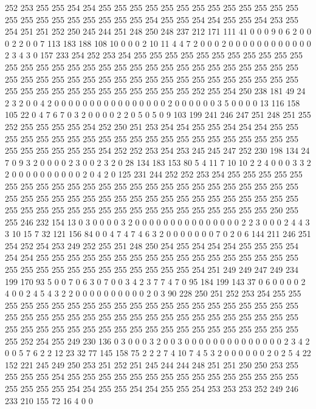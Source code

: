 252 253 255 255 254 254 255 255 255 255 255 255 255 255 255 255 255 255 255 255
255 255 255 255 255 255 255 255 254 255 255 254 254 255 255 254 253 255 254 251
251 252 250 245 244 251 248 250 248 237 212 171 111 41 0 0 0 9 0 6
2 0 0 0 2 2 0 0 7 113 183 188 108 10 0 0 0 2 10 11
4 4 7 2 0 0 0 2 0 0 0 0 0 0 0 0 0 0 0 0
2 3 4 3 0 157 233 254 252 253 254 255 255 255 255 255 255 255 255 255
255 255 255 255 255 255 255 255 255 255 255 255 255 255 255 255 255 255 255 255
255 255 255 255 255 255 255 255 255 255 255 255 255 255 255 255 255 255 255 255
255 255 255 255 255 255 255 255 255 255 255 255 252 255 254 250 238 181 49 24
2 3 2 0 0 4 2 0 0 0 0 0 0 0 0 0 0 0 0 0
0 0 0 2 0 0 0 0 0 0 3 5 0 0 0 0 13 116 158 105
22 0 4 7 6 7 0 3 2 0 0 0 0 2 2 0 5 0 5 0
9 103 199 241 246 247 251 248 251 255 252 255 255 255 255 254 252 250 251 253
254 254 255 255 254 254 254 255 255 255 255 255 255 255 255 255 255 255 255 255
255 255 255 255 255 255 255 255 255 255 255 255 255 255 254 252 252 253 254 253
245 245 247 252 230 198 134 24 7 0 9 3 2 0 0 0 0 2 3 0
0 2 3 2 0 28 134 183 153 80 5 4 11 7 10 10 2 2 4 0
0 0 3 3 2 2 0 0 0 0 0 0 0 0 0 0 2 0 4 2
0 125 231 244 252 252 253 254 255 255 255 255 255 255 255 255 255 255 255 255
255 255 255 255 255 255 255 255 255 255 255 255 255 255 255 255 255 255 255 255
255 255 255 255 255 255 255 255 255 255 255 255 255 255 255 255 255 255 255 255
255 255 255 255 255 255 255 255 250 255 255 246 232 154 13 0 3 0 0 0
0 3 2 0 0 0 0 0 0 0 0 0 0 0 0 0 0 0 2 2
3 0 0 0 2 4 4 3 3 10 15 7 32 121 156 84 0 0 4 7
4 7 4 6 3 2 0 0 0 0 0 0 0 7 0 2 0 6 144 211
246 251 254 252 254 253 249 252 255 251 248 250 254 255 254 254 254 255 255 255
254 254 254 255 255 255 255 255 255 255 255 255 255 255 255 255 255 255 255 255
255 255 255 255 255 255 255 255 255 255 255 255 254 251 249 249 247 249 234 199
170 93 5 0 0 7 0 6 3 0 7 0 0 3 4 2 3 7 7 4
7 0 95 184 199 143 37 0 6 0 0 0 0 2 4 0 0 2 4 5
4 3 2 2 0 0 0 0 0 0 0 0 0 0 2 0 3 90 228 250
251 252 253 254 255 255 255 255 255 255 255 255 255 255 255 255 255 255 255 255
255 255 255 255 255 255 255 255 255 255 255 255 255 255 255 255 255 255 255 255
255 255 255 255 255 255 255 255 255 255 255 255 255 255 255 255 255 255 255 255
255 255 255 255 252 254 255 249 230 136 0 3 0 0 0 3 2 0 0 3
0 0 0 0 0 0 0 0 0 0 0 0 0 0 2 3 4 2 0 0
5 7 6 2 2 12 23 32 77 145 158 75 2 2 2 7 4 10 7 4
5 3 2 0 0 0 0 0 0 2 0 2 5 4 22 152 221 245 249 250
253 251 252 251 245 244 244 248 251 251 250 250 253 255 255 255 255 254 255 255
255 255 255 255 255 255 255 255 255 255 255 255 255 255 255 255 255 254 254 255
255 254 254 255 255 254 253 253 253 252 249 246 233 210 155 72 16 4 0 0
